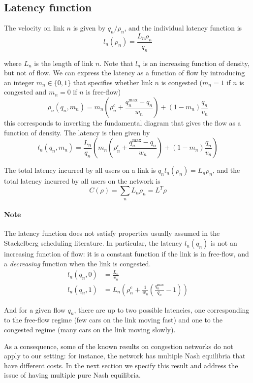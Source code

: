 \subsection{Latency function}
The velocity on link $n$ is given by $q_n/\rho_n$, and the individual latency function is
\[
l_n(\rho_n) = \frac{L_n\rho_n}{q_n} 
\]

where $L_n$ is the length of link $n$.
Note that $l_n$ is an increasing function of density, but not of flow. We can express the latency as a function of flow by introducing an integer $m_n \in \{0, 1\}$ that specifies whether link $n$ is congested ($m_n = 1$ if $n$ is congested and $m_n = 0$ if $n$ is free-flow)
\[
\rho_n(q_n, m_n) = m_n \left( \rho_n^c + \frac{q_n^{\max} - q_n}{w_n} \right) + (1-m_n)\frac{q_n}{v_n}
\]
this corresponds to inverting the fundamental diagram that gives the flow as a function of density. The latency is then given by
\[
l_n(q_n, m_n) = \frac{L_n}{q_n} \left( m_n \left( \rho_n^c + \frac{q_n^{\max} - q_n}{w_n} \right) + (1-m_n)\frac{q_n}{v_n} \right)
\]

The total latency incurred by all users on a link is $q_n l_n(\rho_n) = L_n \rho_n$, and the total latency incurred by all users on the network is
\[
C(\rho) = \sum_n L_n \rho_n = L^T\rho
\]

\paragraph{Note} The latency function does not satisfy properties usually assumed in the Stackelberg scheduling literature. In particular, the latency $l_n(q_n)$ is not an increasing function of flow: it is a constant function if the link is in free-flow, and a \emph{decreasing} function when the link is congested.
\begin{align*}
l_n(q_n, 0) &= \frac{L_n}{v_n}\\
l_n(q_n, 1) &= L_n \left( \rho_n^c + \frac{1}{w_n}(\frac{q_n^{\max}}{q_n} - 1) \right)
\end{align*}

And for a given flow $q_n$, there are up to two possible latencies, one corresponding to the free-flow regime (few cars on the link moving fast) and one to the congested regime (many cars on the link moving slowly).

As a consequence, some of the known results on congestion networks do not apply to our setting: for instance, the network has multiple Nash equilibria that have different costs. In the next section we specify this result and address the issue of having multiple pure Nash equilibria.



